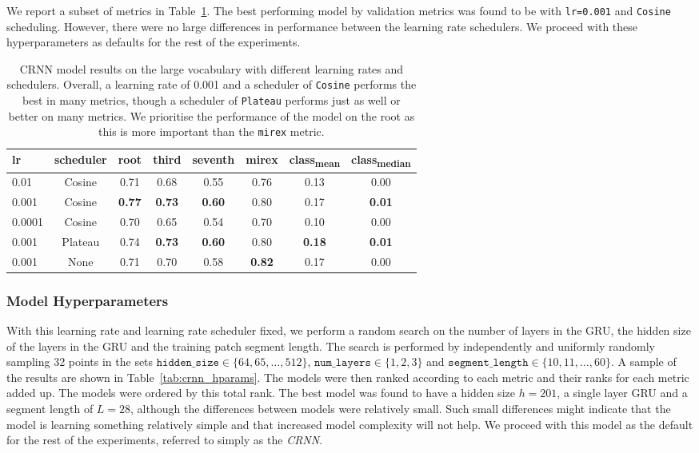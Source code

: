 We report a subset of metrics in Table~\ref{tab:crnn_lr}. The best performing model by validation metrics was found to be with \texttt{lr=0.001} and \texttt{Cosine} scheduling. However, there were no large differences in performance between the learning rate schedulers. We proceed with these hyperparameters as defaults for the rest of the experiments.

\begin{table}[H]
    \centering
    \begin{tabular}{lccccccc}
        \toprule
        lr & scheduler & root & third & seventh & mirex & class\textsubscript{mean} & class\textsubscript{median} \\
        \midrule
        0.01 & Cosine & 0.71 & 0.68 & 0.55 & 0.76 & 0.13 & 0.00 \\
        0.001 & Cosine & \textbf{0.77} & \textbf{0.73} & \textbf{0.60} & 0.80 & 0.17 & \textbf{0.01} \\
        0.0001 & Cosine & 0.70 & 0.65 & 0.54 & 0.70 & 0.10 & 0.00 \\
        \midrule
        0.001 & Plateau & 0.74 & \textbf{0.73} & \textbf{0.60} & 0.80 & \textbf{0.18} & \textbf{0.01} \\
        0.001 & None & 0.71 & 0.70 & 0.58 & \textbf{0.82} & 0.17 & 0.00 \\
        \bottomrule
    \end{tabular}
    \caption{CRNN model results on the large vocabulary with different learning rates and schedulers. Overall, a learning rate of 0.001 and a scheduler of \texttt{Cosine} performs the best in many metrics, though a scheduler of \texttt{Plateau} performs just as well or better on many metrics. We prioritise the performance of the model on the root as this is more important than the \texttt{mirex} metric. }\label{tab:crnn_lr}
\end{table}

\subsubsection{Model Hyperparameters}

With this learning rate and learning rate scheduler fixed, we perform a random search on the number of layers in the GRU, the hidden size of the layers in the GRU and the training patch segment length. The search is performed by independently and uniformly randomly sampling 32 points in the sets $\texttt{hidden\_size}\in\{64,65,\ldots,512\}$, $\texttt{num\_layers}\in\{1,2,3\}$ and $\texttt{segment\_length}\in\{10,11,\ldots,60\}$. A sample of the results are shown in Table~\ref{tab:crnn_hparams}. The models were then ranked according to each metric and their ranks for each metric added up. The models were ordered by this total rank. The best model was found to have a hidden size $h=201$, a single layer GRU and a segment length of $L=28$, although the differences between models were relatively small. Such small differences might indicate that the model is learning something relatively simple and that increased model complexity will not help. We proceed with this model as the default for the rest of the experiments, referred to simply as the \emph{CRNN}.

